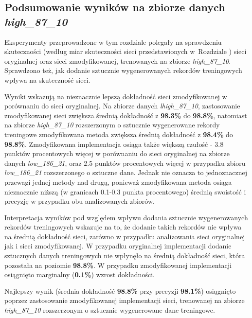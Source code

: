 \subsection{Podsumowanie wyników na zbiorze danych \textit{high\_87\_10}}
Eksperymenty przeprowadzone w tym rozdziale polegały na sprawdzeniu skuteczności (według miar skuteczności sieci przedstawionych w~Rozdziale ) sieci oryginalnej oraz sieci zmodyfikowanej, trenowanych na zbiorze \textit{high\_87\_10}.
Sprawdzono też, jak dodanie sztucznie wygenerowanych rekordów treningowych wpływa na skuteczność sieci.

Wyniki wskazują na nieznacznie lepszą dokładność sieci zmodyfikowanej w porównaniu do sieci oryginalnej.
Na zbiorze danych \textit{lhigh\_87\_10}, zastosowanie zmodyfikowanej sieci zwiększa średnią dokładność z \textbf{98.3\%} do \textbf{98.8\%}, natomiast na zbiorze \textit{high\_87\_10} rozszerzonym o sztucznie wygenerowane rekordy treningowe zmodyfikowana metoda zwiększa średnią dokładność z \textbf{98.4\%} do \textbf{98.8\%}. 
Zmodyfikowana implementacja osiąga także większą czułość - 3.8 punktów procentowych więcej w porównaniu do sieci oryginalnej na zbiorze danych \textit{low\_186\_21}, oraz 2.5 punktów procentowych więcej w przypadku zbioru \textit{low\_186\_21} rozszerzonego o sztuczne dane.
Jednak nie oznacza to jednoznacznej przewagi jednej metody nad drugą, ponieważ zmodyfikowana metoda osiąga nieznacznie niższą (w granicach 0.1-0.3 punkta procentowego) średnią swoistość i precyzję w przypadku obu analizowanych zbiorów.


Interpretacja wyników pod względem wpływu dodania sztucznie wygenerowanych rekordów treningowych wskazuje na to, że dodanie takich rekordów nie wpływa na średnią dokładność sieci, zarówno w przypadku analizowania sieci oryginalnej jak i sieci zmodyfikowanej. W przypadku oryginalnej implementacji dodanie sztucznych danych treningowych nie wpłynęło na średnią dokładność sieci, która pozostała na poziomie \textbf{98.8\%}. W przypadku zmodyfikowanej implementacji osiągnięto marginalny (\textbf{0.1\%}) wzrost dokładności.


Najlepszy wynik (średnia dokładność \textbf{98.8\%} przy precyzji \textbf{98.1\%}) osiągnięto poprzez zastosowanie zmodyfikowanej implementacji sieci, trenowanej na zbiorze \textit{high\_87\_10} rozszerzonym o sztucznie wygenerowane dane treningowe.
